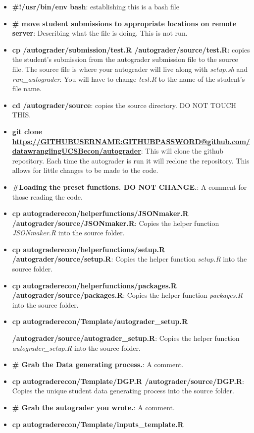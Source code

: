 \documentclass[
]{article}
\begin{document}
\begin{itemize}
\item
  \textbf{\#!/usr/bin/env bash}: establishing this is a bash file
\item
  \textbf{\# move student submissions to appropriate locations on remote
  server}: Describing what the file is doing. This is not run.
\item
  \textbf{cp /autograder/submission/test.R /autograder/source/test.R}:
  copies the student's submission from the autograder submission file to
  the source file. The source file is where your autograder will live
  along with \emph{setup.sh} and \emph{run\_autograder}. You will have
  to change \emph{test.R} to the name of the student's file name.
\item
  \textbf{cd /autograder/source}: copies the source directory. DO NOT
  TOUCH THIS.
\item
  \textbf{git clone
  \url{https://GITHUBUSERNAME:GITHUBPASSWORD@github.com/datawranglingUCSBecon/autograder}}:
  This will clone the github repository. Each time the autograder is run
  it will reclone the repository. This allows for little changes to be
  made to the code.
\item
  \textbf{\#Loading the preset functions. DO NOT CHANGE.}: A comment for
  those reading the code.
\item
  \textbf{cp autograderecon/helperfunctions/JSONmaker.R
  /autograder/source/JSONmaker.R}: Copies the helper function
  \emph{JSONmaker.R} into the source folder.
\item
  \textbf{cp autograderecon/helperfunctions/setup.R
  /autograder/source/setup.R}: Copies the helper function \emph{setup.R}
  into the source folder.
\item
  \textbf{cp autograderecon/helperfunctions/packages.R
  /autograder/source/packages.R}: Copies the helper function
  \emph{packages.R} into the source folder.
\item
  \textbf{cp autograderecon/Template/autograder\_setup.R}

  \textbf{/autograder/source/autograder\_setup.R}: Copies the helper
  function \emph{autograder\_setup.R} into the source folder.
\item
  \textbf{\# Grab the Data generating process.}: A comment.
\item
  \textbf{cp autograderecon/Template/DGP.R /autograder/source/DGP.R}:
  Copies the unique student data generating process into the source
  folder.
\item
  \textbf{\# Grab the autograder you wrote.}: A comment.
\item
  \textbf{cp autograderecon/Template/inputs\_template.R}


\end{itemize}
\end{document}
